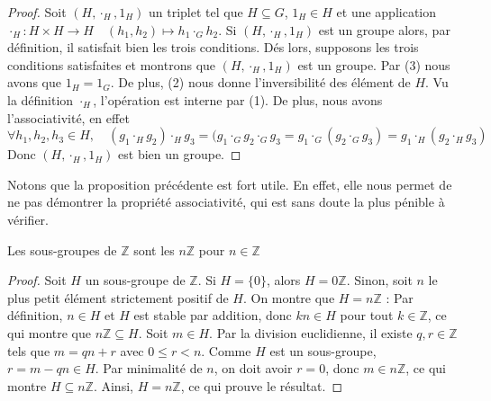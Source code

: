 \begin{proof}
    Soit $(H,\cdot _H,1_H)$ un triplet tel que $H\subseteq G$, $1_H\in H$ et une application $\cdot _H:H\times H\to H\quad (h_1,h_2)\mapsto h_1\cdot_G h_2$. Si $(H,\cdot _H,1_H)$ est un groupe alors, par définition, il satisfait bien les trois conditions. Dés lors, supposons les trois conditions satisfaites et montrons que $(H,\cdot _H,1_H)$ est un groupe. Par (3) nous avons que $1_H=1_G$. De plus, (2) nous donne l'inversibilité des élément de $H$. Vu la définition $\cdot_H$, l'opération est interne par (1). De plus, nous avons l'associativité, en effet \[\forall h_1,h_2,h_3\in H, \quad (g_1\cdot_Hg_2)\cdot_H g_3=(g_1\cdot_G g_2\cdot_Gg_3=g_1\cdot_G (g_2\cdot_Gg_3)=g_1\cdot_H(g_2\cdot_H g_3)\]
    Donc $(H,\cdot _H,1_H)$ est bien un groupe.
\end{proof}

\begin{remarque}
    Notons que la proposition précédente est fort utile. En effet, elle nous permet de ne pas démontrer la propriété associativité, qui est sans doute la plus pénible à vérifier. 
\end{remarque}

\begin{proposition}
    Les sous-groupes de $\mathbb{Z}$ sont les $n\mathbb{Z}$ pour $n\in \mathbb{Z}$
\end{proposition}

\begin{proof}
    Soit $H$ un sous-groupe de $\mathbb{Z}$. Si $H = \{0\}$, alors $H = 0\mathbb{Z}$. Sinon, soit $n$ le plus petit élément strictement positif de $H$. On montre que $H = n\mathbb{Z}$ :
Par définition, $n \in H$ et $H$ est stable par addition, donc $k n \in H$ pour tout $k \in \mathbb{Z}$, ce qui montre que $n\mathbb{Z} \subseteq H$.
Soit $m \in H$. Par la division euclidienne, il existe $q, r \in \mathbb{Z}$ tels que $m = qn + r$ avec $0 \leq r < n$. Comme $H$ est un sous-groupe, $r = m - qn \in H$. Par minimalité de $n$, on doit avoir $r = 0$, donc $m \in n\mathbb{Z}$, ce qui montre $H \subseteq n\mathbb{Z}$.
Ainsi, $H = n\mathbb{Z}$, ce qui prouve le résultat.
\end{proof}

